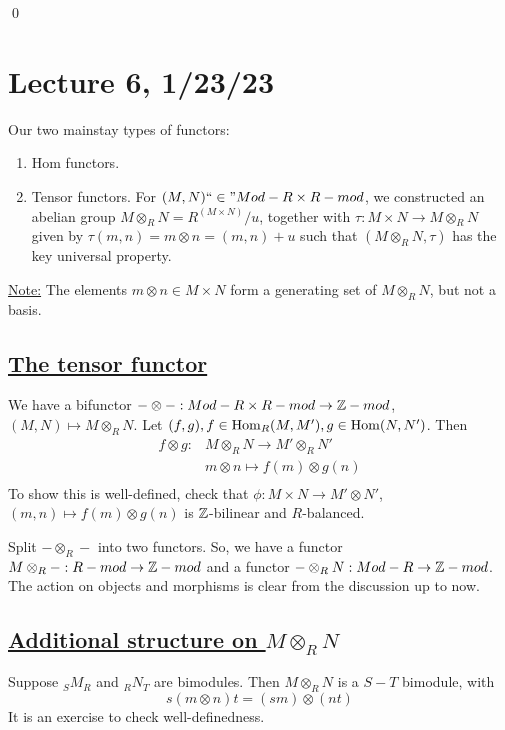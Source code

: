 \documentclass[x11names,reqno,14pt]{extarticle}
\newcommand{\fin}{``\in"}
\begin{document}
\qed


\section*{Lecture 6, 1/23/23}

Our two mainstay types of functors: 

\begin{enumerate}[label=(\roman*)]

\item Hom functors. 

\item Tensor functors. For $(M, N) \fin Mod-R\times R-mod$, we constructed an abelian group $M\otimes_R N = R^{(M\times N)}/u$, together with $\tau:M\times N \to M\otimes_RN$ given by $\tau(m, n) = m\otimes n = (m, n) + u$ such that $(M\otimes_RN,\tau)$ has the key universal property. 
\end{enumerate}

\underline{Note:} The elements $m\otimes n\in M\times N$ form a generating set of $M\otimes_RN$, but not a basis. 

\subsection*{\underline{The tensor functor}}

We have a bifunctor $-\otimes-:Mod-R\times R-mod \to \mathbb{Z}-mod$, $(M, N)\mapsto M\otimes_RN$. Let $(f, g), f \in {\mathrm{Hom}}_R(M,M'), g \in {\mathrm{Hom}}(N, N')$. Then 
\begin{align*}
f\otimes g: & M\otimes_RN \to M'\otimes_RN' \\
			   & m\otimes n \mapsto f(m)\otimes g(n) \\
\end{align*}
To show this is well-defined, check that $\phi:M\times N \to M'\otimes N'$, $(m, n)\mapsto f(m)\otimes g(n)$ is $\mathbb{Z}$-bilinear and $R$-balanced. 

Split $-\otimes_R-$ into two functors. So, we have a functor $M\otimes_R-:R-mod\to\mathbb{Z}-mod$ and a functor $-\otimes_RN:Mod-R\to\mathbb{Z}-mod$. The action on objects and morphisms is clear from the discussion up to now. 

\subsection*{\underline{Additional structure on $M\otimes_RN$}} 

Suppose $_SM_R$ and $_RN_T$ are bimodules. Then $M\otimes_RN$ is a $S-T$ bimodule, with
\[
s(m\otimes n)t = (sm)\otimes(nt)
\]
It is an exercise to check well-definedness. 
\end{document}
